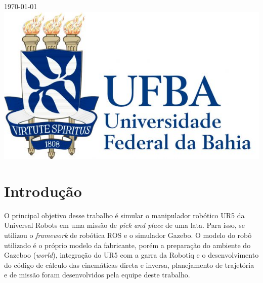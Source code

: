 \begin{titlepage}

{\large \today}\\[2cm] %


\includegraphics[scale=0.3]{images/ufba_logo.jpg}\\[1cm] %
 

\vfill %

\end{titlepage}

\tableofcontents
\pagebreak

\section{Introdução}

O principal objetivo desse trabalho é simular o manipulador robótico UR5
da Universal Robots em uma missão de \textit{pick and place} de 
uma lata. Para isso, se utilizou o \textit{framework} de robótica ROS 
e o simulador Gazebo. O modelo do robô utilizado é o próprio modelo da 
fabricante, porém a preparação do ambiente do Gazeboo (\textit{world}),
integração do UR5 com a garra da Robotiq  e o desenvolvimento do código
de cálculo das cinemáticas direta e inversa, planejamento de trajetória e 
de missão foram desenvolvidos pela equipe deste trabalho.


